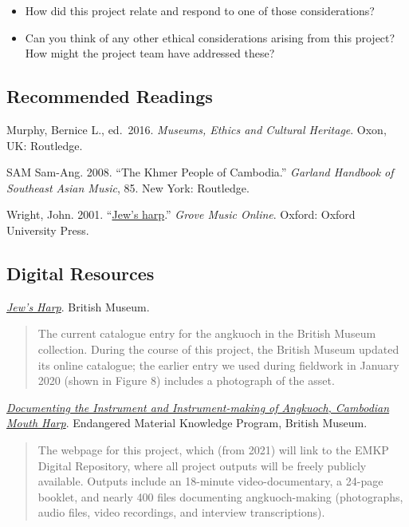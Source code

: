 \documentclass[twoside]{article}
\begin{document}
\begin{itemize}
\item
  How did this project relate and respond to one of those
  considerations?
\item
  Can you think of any other ethical considerations arising from this
  project? How might the project team have addressed these?
\end{itemize}

\hypertarget{recommended-readings}{%
\subsection*{Recommended Readings}\label{recommended-readings}}

Murphy, Bernice L., ed.~2016. \emph{Museums, Ethics and
Cultural Heritage}. Oxon, UK: Routledge.

SAM Sam-Ang. 2008. ``The Khmer People of Cambodia.''
\emph{Garland Handbook of Southeast Asian Music}, 85. New York:
Routledge.

Wright, John. 2001.
``\href{https://www.oxfordmusiconline.com/grovemusic/view/10.1093/gmo/9781561592630.001.0001/omo-9781561592630-e-0000014300}{Jew's
harp}.'' \emph{Grove Music Online}. Oxford: Oxford University Press.

\hypertarget{digital-resources}{%
\subsection*{Digital Resources}\label{digital-resources}}

\href{https://www.britishmuseum.org/collection/object/A_As1966-11-5}{\emph{Jew's
Harp}}. British Museum.

\begin{quote}
The current catalogue entry for the angkuoch in the British Museum
collection. During the course of this project, the British Museum
updated its online catalogue; the earlier entry we used during fieldwork
in January 2020 (shown in Figure 8) includes a photograph of the asset.
\end{quote}

\href{https://www.emkp.org/documentingcambodianmouthharp/}{\emph{Documenting
the Instrument and Instrument-making of Angkuoch, Cambodian Mouth
Harp}}. Endangered Material Knowledge Program, British Museum.

\begin{quote}
The webpage for this project, which (from 2021) will link to the EMKP
Digital Repository, where all project outputs will be freely publicly
available. Outputs include an 18-minute video-documentary, a 24-page
booklet, and nearly 400 files documenting angkuoch-making (photographs,
audio files, video recordings, and interview transcriptions).
\end{quote}
\end{document}
